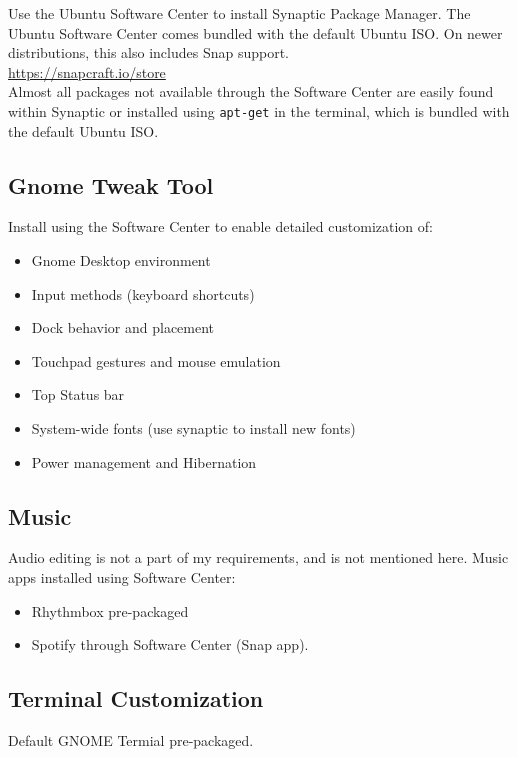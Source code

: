 \documentclass[10pt,letterpaper]{article}
\begin{document}
Use the Ubuntu Software Center to install Synaptic Package Manager. The Ubuntu Software Center comes bundled with the default Ubuntu ISO. On newer distributions, this also includes Snap support. \\

\url{https://snapcraft.io/store}\\

Almost all packages not available through the Software Center are easily found within Synaptic or installed using \texttt{apt-get} in the terminal, which is bundled with the default Ubuntu ISO.

\subsection{Gnome Tweak Tool}
Install using the Software Center to enable detailed customization of:


\begin{itemize}
	\item Gnome Desktop environment 
	\item Input methods (keyboard shortcuts) 
	\item Dock behavior and placement
	\item Touchpad gestures and mouse emulation
	\item Top Status bar
	\item System-wide fonts (use synaptic to install new fonts) 
	\item Power management and Hibernation
\end{itemize}

\subsection{Music}

Audio editing is not a part of my requirements, and is not mentioned here.
Music apps installed using Software Center:

\begin{itemize}
	\item Rhythmbox pre-packaged
	\item Spotify through Software Center (Snap app).
\end{itemize}

\subsection{Terminal Customization}

Default GNOME Termial pre-packaged.
\end{document}
